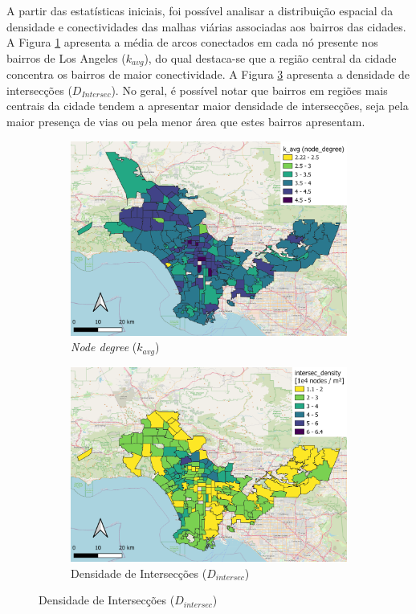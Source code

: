 A partir das estatísticas iniciais, foi possível analisar a distribuição espacial da densidade e conectividades das malhas viárias associadas aos bairros das cidades. 
A Figura \ref{fig:conectividadeLA} apresenta a média de arcos conectados em cada nó presente nos bairros de Los Angeles ($k_{avg}$), do qual destaca-se que a região central da cidade concentra os bairros de maior conectividade.
A Figura \ref{fig:densidade_intersec} apresenta a densidade de intersecções ($D_{Intersec}$).
No geral, é possível notar que bairros em regiões mais centrais da cidade tendem a apresentar maior densidade de intersecções, seja pela maior presença de vias ou pela menor área que estes bairros apresentam. 

\begin{figure}[H]
    \centering
    \caption{Densidade e conectividade dos bairros da cidade de Los Angeles (\textit{Amazon})} 
    \begin{subfigure}{0.49\textwidth} 
        \caption{\textit{Node degree} ($k_{avg}$)} \label{fig:conectividadeLA}
        \includegraphics[width=\textwidth]{images/6_amazon/conectividade/k_avg.png}
    \end{subfigure}
    \begin{subfigure}{0.49\textwidth}
        \caption{Densidade de Intersecções ($D_{intersec}$)} \label{fig:densidade_intersec}
        \includegraphics[width=\textwidth]{images/6_amazon/conectividade/la_intersec_density.png}

\end{subfigure}
\end{figure}

